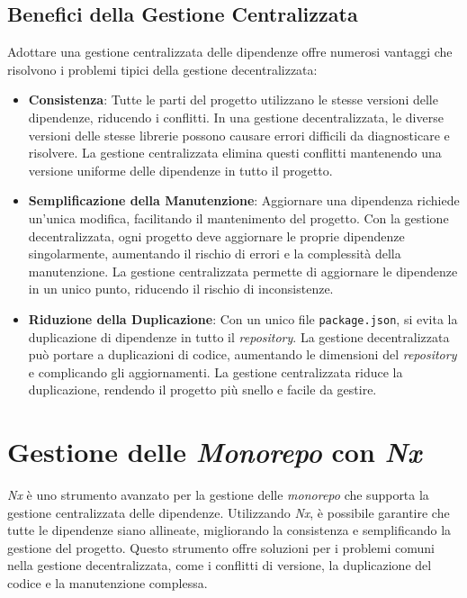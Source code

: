 \subsection{Benefici della Gestione Centralizzata}
Adottare una gestione centralizzata delle dipendenze offre numerosi vantaggi che risolvono i problemi tipici della gestione decentralizzata:

\begin{itemize}
    \item \textbf{Consistenza}: Tutte le parti del progetto utilizzano le stesse versioni delle dipendenze, riducendo i conflitti.
    In una gestione decentralizzata, le diverse versioni delle stesse librerie possono causare errori difficili da diagnosticare e risolvere.
    La gestione centralizzata elimina questi conflitti mantenendo una versione uniforme delle dipendenze in tutto il progetto.
    \item \textbf{Semplificazione della Manutenzione}: Aggiornare una dipendenza richiede un'unica modifica, facilitando il mantenimento del progetto.
    Con la gestione decentralizzata, ogni progetto deve aggiornare le proprie dipendenze singolarmente, aumentando il rischio di errori e la complessità della manutenzione.
    La gestione centralizzata permette di aggiornare le dipendenze in un unico punto, riducendo il rischio di inconsistenze.
    \item \textbf{Riduzione della Duplicazione}: Con un unico file \texttt{package.json}, si evita la duplicazione di dipendenze in tutto il \textit{repository}.
    La gestione decentralizzata può portare a duplicazioni di codice, aumentando le dimensioni del \textit{repository} e complicando gli aggiornamenti.
    La gestione centralizzata riduce la duplicazione, rendendo il progetto più snello e facile da gestire.
\end{itemize}

\section{Gestione delle \textit{Monorepo} con \textit{Nx}}
\textit{Nx} è uno strumento avanzato per la gestione delle \textit{monorepo} che supporta la gestione centralizzata delle dipendenze.
Utilizzando \textit{Nx}, è possibile garantire che tutte le dipendenze siano allineate, migliorando la consistenza e semplificando la gestione del progetto.
Questo strumento offre soluzioni per i problemi comuni nella gestione decentralizzata, come i conflitti di versione, la duplicazione del codice e la manutenzione complessa.

